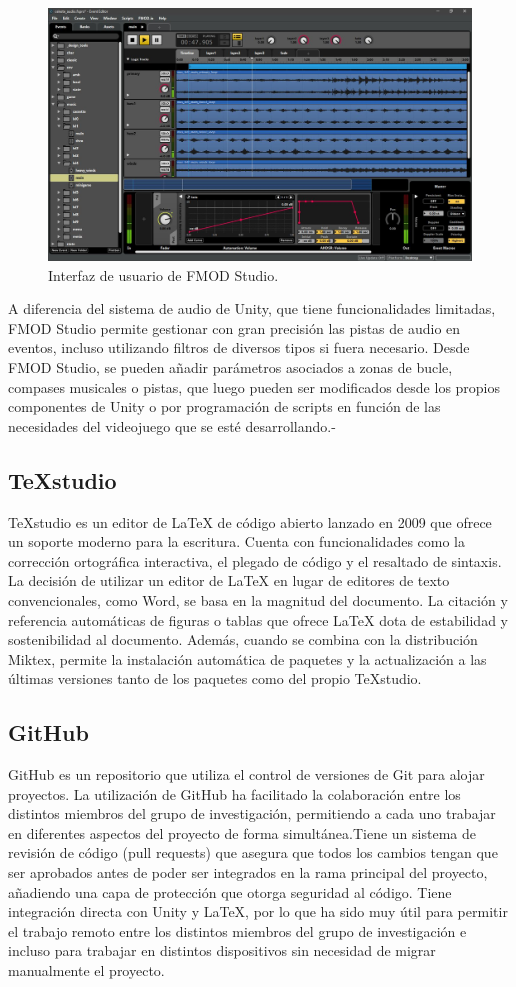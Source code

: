 \begin{figure}[h!]
	\centering
	\includegraphics[width=0.6\linewidth]{./Figuras/Aspectos/FMODStudio.jpg}
	\caption{Interfaz de usuario de FMOD Studio.}
	\label{fig:FMODUI}
\end{figure}

A diferencia del sistema de audio de Unity, que tiene funcionalidades limitadas, FMOD Studio permite gestionar con gran precisión las pistas de audio en eventos, incluso utilizando filtros de diversos tipos si fuera necesario. Desde FMOD Studio, se pueden añadir parámetros asociados a zonas de bucle, compases musicales o pistas, que luego pueden ser modificados desde los propios componentes de Unity o por programación de scripts en función de las necesidades del videojuego que se esté desarrollando.-

\subsection{TeXstudio}

TeXstudio es un editor de LaTeX de código abierto lanzado en 2009 que ofrece un soporte moderno para la escritura. Cuenta con funcionalidades como la corrección ortográfica interactiva, el plegado de código y el resaltado de sintaxis. La decisión de utilizar un editor de LaTeX en lugar de editores de texto convencionales, como Word, se basa en la magnitud del documento. La citación y referencia automáticas de figuras o tablas que ofrece LaTeX dota de estabilidad y sostenibilidad al documento. Además, cuando se combina con la distribución Miktex, permite la instalación automática de paquetes y la actualización a las últimas versiones tanto de los paquetes como del propio TeXstudio.

\subsection{GitHub}

GitHub es un repositorio que utiliza el control de versiones de Git para alojar proyectos. La utilización de GitHub ha facilitado la colaboración entre los distintos miembros del grupo de investigación, permitiendo a cada uno trabajar en diferentes aspectos del proyecto de forma simultánea.Tiene un sistema de revisión de código (pull requests) que asegura que todos los cambios tengan que ser aprobados antes de poder ser integrados en la rama principal del proyecto, añadiendo una capa de protección que otorga seguridad al código. Tiene integración directa con Unity y LaTeX, por lo que ha sido muy útil para permitir el trabajo remoto entre los distintos miembros del grupo de investigación e incluso para trabajar en distintos dispositivos sin necesidad de migrar manualmente el proyecto.